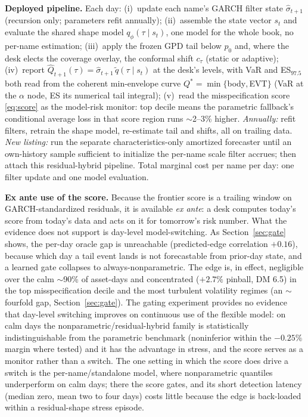 \documentclass[11pt]{article}
\theoremstyle{remark}
\begin{document}
\medskip\noindent\textbf{Deployed pipeline.} Each day: (i)~update each name's GARCH filter state
$\widehat\sigma_{t+1}$ (recursion only; parameters refit annually);
(ii)~assemble the state vector $s_t$ and evaluate the shared shape model $q_\phi(\tau\mid s_t)$, one model for the whole book, no
per-name estimation; (iii)~apply the frozen GPD tail below $p_0$
and, where the desk elects the coverage overlay, the conformal shift
$c_\tau$ (static or adaptive); (iv)~report
$\widehat Q_{t+1}(\tau) = \widehat\sigma_{t+1}\,\widetilde q(\tau\mid s_t)$
at the desk's levels, with VaR and ES$_{97.5}$ both read from the coherent
min-envelope curve $Q^{*}=\min\{$body$,$EVT$\}$ (VaR at the $\alpha$
node, ES its numerical tail integral); (v)~read
the misspecification score \eqref{eq:score} as the model-risk monitor: top decile means the parametric fallback's conditional average loss
in that score region runs $\sim$2--3\% higher. \emph{Annually:} refit filters, retrain the shape model,
re-estimate tail and shifts, all on trailing data. \emph{New listing:}
run the separate characteristics-only amortized forecaster until an
own-history sample sufficient to initialize the per-name scale filter
accrues; then attach this residual-hybrid pipeline. Total marginal
cost per name per day: one filter update and
one model evaluation.

\medskip
\textbf{Ex ante use of the score.} Because the frontier score is a trailing window on
GARCH-standardized residuals, it is available \emph{ex ante}: a desk
computes today's score from today's data and acts on it for tomorrow's
risk number. What the evidence does not support is day-level
model-switching. As Section~\ref{sec:gate} shows, the per-day oracle gap
is unreachable (predicted-edge correlation $+0.16$), because which day a
tail event lands is not forecastable from prior-day state, and a learned
gate collapses to always-nonparametric. The edge is, in effect,
negligible over the calm $\sim$90\% of asset-days and concentrated
($+2.7\%$ pinball, DM 6.5) in the top misspecification decile and the
most turbulent volatility regimes (an $\sim$fourfold gap,
Section~\ref{sec:gate}). The gating experiment provides no evidence
that day-level switching improves on continuous use of the flexible
model: on calm days the nonparametric/residual-hybrid family is
statistically indistinguishable from the parametric benchmark
(noninferior within the $-0.25\%$ margin where tested) and it has the
advantage in stress, and the score serves as a monitor rather than a
switch. The
one setting in which the score does drive a switch is the
per-name/standalone model, where nonparametric quantiles underperform on
calm days; there the score gates, and its short detection latency
(median zero, mean two to four days) costs little because the edge is
back-loaded within a residual-shape stress episode.
\end{document}
